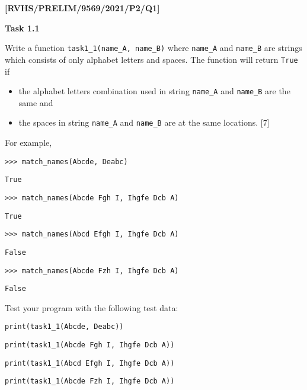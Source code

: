 \item \textbf{{[}RVHS/PRELIM/9569/2021/P2/Q1{]} }

\textbf{Task 1.1}

Write a function \texttt{task1\_1(name\_A, name\_B)} where \texttt{name\_A}
and \texttt{name\_B} are strings which consists of only alphabet letters
and spaces. The function will return \texttt{True} if 
\begin{itemize}
\item the alphabet letters combination used in string \texttt{name\_A} and
\texttt{name\_B} are the same and
\item the spaces in string \texttt{name\_A} and \texttt{name\_B} are at
the same locations. \hfill{}{[}7{]}
\end{itemize}
For example, 

\noindent %
\noindent\begin{minipage}[t]{1\columnwidth}%
\texttt{>\textcompwordmark >\textcompwordmark > match\_names(\textquotedbl Abcde\textquotedbl ,
\textquotedbl Deabc\textquotedbl ) }

\texttt{True }

\texttt{>\textcompwordmark >\textcompwordmark > match\_names(\textquotedbl Abcde
Fgh I\textquotedbl , \textquotedbl Ihgfe Dcb A\textquotedbl ) }

\texttt{True }

\texttt{>\textcompwordmark >\textcompwordmark > match\_names(\textquotedbl Abcd
Efgh I\textquotedbl , \textquotedbl Ihgfe Dcb A\textquotedbl ) }

\texttt{False }

\texttt{>\textcompwordmark >\textcompwordmark > match\_names(\textquotedbl Abcde
Fzh I\textquotedbl , \textquotedbl Ihgfe Dcb A\textquotedbl ) }

\texttt{False} %
\end{minipage}

Test your program with the following test data: 

\noindent\begin{minipage}[t]{1\columnwidth}%
\texttt{print(task1\_1(\textquotedbl Abcde\textquotedbl , \textquotedbl Deabc\textquotedbl )) }

\texttt{print(task1\_1(\textquotedbl Abcde Fgh I\textquotedbl ,
\textquotedbl Ihgfe Dcb A\textquotedbl )) }

\texttt{print(task1\_1(\textquotedbl Abcd Efgh I\textquotedbl ,
\textquotedbl Ihgfe Dcb A\textquotedbl )) }

\texttt{print(task1\_1(\textquotedbl Abcde Fzh I\textquotedbl ,
\textquotedbl Ihgfe Dcb A\textquotedbl ))}%
\end{minipage} 

